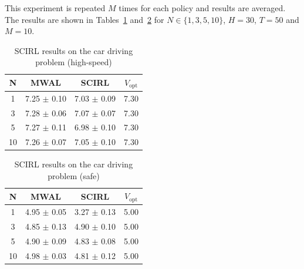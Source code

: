 \documentclass{article}
\begin{document}
This experiment is repeated $M$ times for each policy and results
are averaged. The results are shown in
Tables~\ref{table:highway_fast} and~\ref{table:highway_safe}
 for $N \in
\{1, 3, 5, 10\}$, $H = 30$, $T=50$ and $M = 10$.

%

\begin{table}
\begin{center}
    \begin{tabular}{|c|c|c|c|}
    \hline
    N     & MWAL              & SCIRL               & $V_{\text{opt}}$ \\\hline\hline
    1     & 7.25 $\pm$ 0.10   & 7.03 $\pm$ 0.09     & 7.30              \\\hline
    3     & 7.28 $\pm$ 0.06   & 7.07 $\pm$ 0.07     & 7.30              \\\hline
    5     & 7.27 $\pm$ 0.11   & 6.98 $\pm$ 0.10     & 7.30              \\\hline
    10    & 7.26 $\pm$ 0.07   & 7.05 $\pm$ 0.10     & 7.30              \\
    \hline
    \end{tabular}
    \caption{SCIRL results on the car driving
    problem (high-speed)}\label{table:highway_fast}
\end{center}
\end{table}

\begin{table}
\begin{center}
    \begin{tabular}{|c|c|c|c|}
    \hline
    N     & MWAL              & SCIRL               & $V_{\text{opt}}$ \\\hline\hline
    1     & 4.95 $\pm$ 0.05   & 3.27 $\pm$ 0.13     & 5.00              \\\hline
    3     & 4.85 $\pm$ 0.13   & 4.90 $\pm$ 0.10     & 5.00              \\\hline
    5     & 4.90 $\pm$ 0.09   & 4.83 $\pm$ 0.08     & 5.00              \\\hline
    10    & 4.98 $\pm$ 0.03   & 4.81 $\pm$ 0.12     & 5.00              \\
    \hline
    \end{tabular}
    \caption{SCIRL results on the car driving
    problem (safe)}\label{table:highway_safe}
\end{center}
\end{table}
\end{document}
